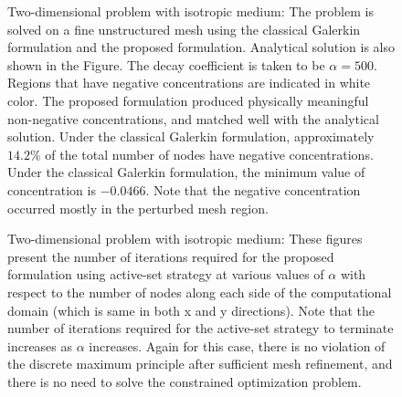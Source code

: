 \documentclass[11pt]{amsart}
\begin{document}
\begin{figure}      
\caption{Two-dimensional problem with isotropic medium: The problem is solved on a fine 
    unstructured mesh using the classical Galerkin formulation and the proposed formulation. 
    Analytical solution is also shown in the Figure. The decay coefficient is taken to be 
    $\alpha = 500$. Regions that have negative concentrations are indicated in white color. 
    The proposed formulation produced physically meaningful non-negative concentrations, 
    and matched well with the analytical solution. Under the classical Galerkin formulation, 
    approximately $14.2\%$ of the total number of nodes have negative concentrations. 
    Under the classical Galerkin formulation, the  minimum value of concentration is  
    $-0.0466$. Note that the negative concentration occurred mostly in the perturbed 
    mesh region.} \label{Fig:Decay_2D_perturbed_mesh}
\end{figure}

\begin{figure}[!h]
  \centering
\caption{Two-dimensional problem with isotropic medium: These figures present the 
    number of iterations required for the proposed formulation using active-set 
    strategy at various values of $\alpha$ with respect to the number of nodes along 
    each side of the computational domain (which is same in both x and y directions). 
    Note that the number of iterations required for the active-set strategy to terminate 
    increases as $\alpha$ increases. Again for this case, there is no violation of the 
    discrete maximum principle after sufficient mesh refinement, and there is no need 
    to solve the constrained optimization problem.} \label{Fig:Decay_2D_active_set_iterations}
\end{figure}
\end{document}
